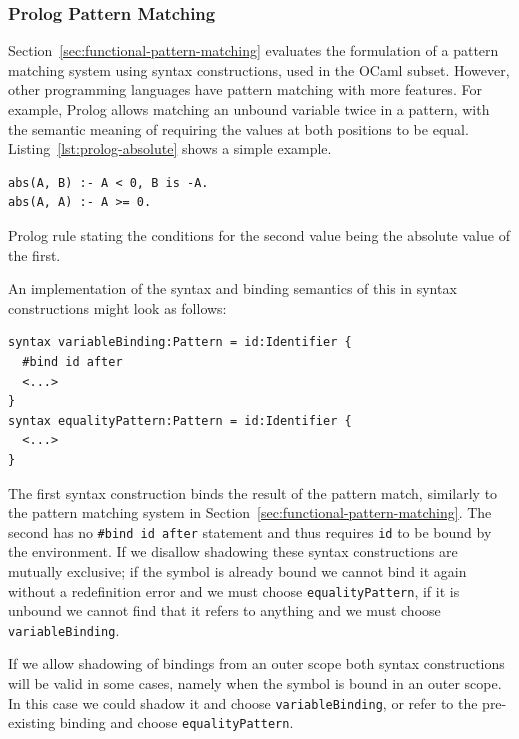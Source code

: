 \documentclass{kththesis}
\begin{document}
\subsubsection{Prolog Pattern Matching} \label{sec:prolog-pattern-matching}

Section~\ref{sec:functional-pattern-matching} evaluates the formulation of a pattern matching system using syntax constructions, used in the OCaml subset. However, other programming languages have pattern matching with more features. For example, Prolog allows matching an unbound variable twice in a pattern, with the semantic meaning of requiring the values at both positions to be equal. Listing~\ref{lst:prolog-absolute} shows a simple example.

\begin{listing}[t]
\begin{verbatim}
abs(A, B) :- A < 0, B is -A.
abs(A, A) :- A >= 0.
\end{verbatim}
\caption{Prolog rule stating the conditions for the second value being the absolute value of the first.}
\label{lst:prolog-absolute}
\end{listing}

An implementation of the syntax and binding semantics of this in syntax constructions might look as follows:

\begin{verbatim}
syntax variableBinding:Pattern = id:Identifier {
  #bind id after
  <...>
}
syntax equalityPattern:Pattern = id:Identifier {
  <...>
}
\end{verbatim}

The first syntax construction binds the result of the pattern match, similarly to the pattern matching system in Section~\ref{sec:functional-pattern-matching}. The second has no \texttt{#bind id after} statement and thus requires \texttt{id} to be bound by the environment. If we disallow shadowing these syntax constructions are mutually exclusive; if the symbol is already bound we cannot bind it again without a redefinition error and we must choose \texttt{equalityPattern}, if it is unbound we cannot find that it refers to anything and we must choose \texttt{variableBinding}.

If we allow shadowing of bindings from an outer scope both syntax constructions will be valid in some cases, namely when the symbol is bound in an outer scope. In this case we could shadow it and choose \texttt{variableBinding}, or refer to the pre-existing binding and choose \texttt{equalityPattern}.
\end{document}
